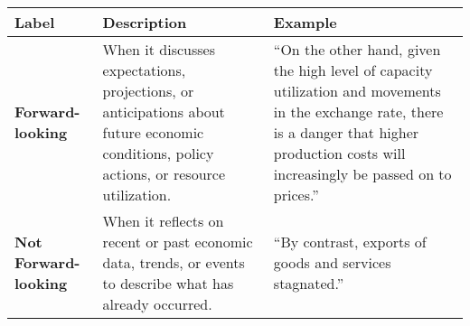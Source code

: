 \begin{table*}
    \caption{}
    \vspace{1em}
    \begin{tabular}{p{}p{}p{}}
    \toprule
    \textbf{Label} & \textbf{Description} & \textbf{Example}\\
    \midrule
    \textbf{Forward-looking} & When it discusses expectations, projections, or anticipations about future economic conditions, policy actions, or resource utilization. & “On the other hand, given the high level of capacity utilization and movements in the exchange rate, there is a danger that higher production costs will increasingly be passed on to prices.” \\
    \midrule
    \textbf{Not Forward-looking} & When it reflects on recent or past economic data, trends, or events to describe what has already occurred. & “By contrast, exports of goods and services stagnated.” \\
    \bottomrule
    \end{tabular}
    \label{tb:fomc_forward_looking_guide}
    \end{table*}
